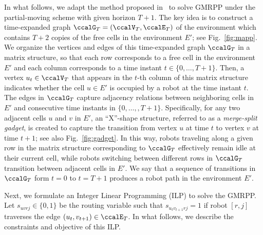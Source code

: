 \documentclass[Afour,sageh,times]{sagej}
\begin{document}
{{{{  In what follows, we adapt the method proposed in~\cite{yu2016optimal} to solve GMRPP under the partial-moving scheme with given horizon $T+1$.   The key idea is to construct a time-expanded graph $\ccalG_T = (\ccalV_T, \ccalE_T)$ of the environment which contains $T+2$ copies of the free cells in the environment $E'$; see Fig.~\ref{fig:mapp}. We organize the vertices and edges of this time-expanded graph $\ccalG_T$ in a matrix structure, so that each row corresponds to a free cell in the environment $E'$ and each column corresponds to a time instant $t\in \{0,\ldots,T+1\}$. Then, a vertex $u_t \in \ccalV_T$ that appears in the $t$-th column of this matrix structure indicates whether the cell $u\in E'$ is occupied by a robot at the time instant $t$. The edges in $\ccalG_T$ capture  adjacency relations between neighboring cells in $E'$ and consecutive time instants in $\{0,\ldots,,T+1\}$. Specifically, for any two adjacent cells $u$ and $v$ in $E'$, an ``X''-shape structure, referred to as a {\it merge-split gadget}, is created to capture the transition from vertex $u$ at time $t$ to vertex $v$ at time $t+1$; see also Fig.~\ref{fig:gadget}. In this way, robots traveling along a given row in the matrix structure corresponding to $\ccalG_T$ effectively remain idle at their current cell, while robots switching between different rows in $\ccalG_T$ transition between adjacent cells in $E'$. We say that a sequence of transitions in $\ccalG_T$ form $t=0$ to $t=T+1$ produces a robot path in the environment $E'$.

Next, we formulate an Integer Linear Programming (ILP) to solve the GMRPP. Let $s_{uvrj} \in\{0,1\}$ be the routing variable such that $s_{u_{t}v_{t+1}rj} = 1$ if robot $[r,j]$ traverses the edge $(u_t,v_{t+1}) \in \ccalE_T$. In what follows, we describe the constraints and objective of this ILP.


}}}}
\end{document}
